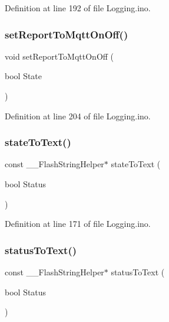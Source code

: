 Definition at line 192 of file Logging.\+ino.

\mbox{\label{_logging_8ino_a116482fed98acd57e3758b7e5a8a0d1c}} 
\subsubsection{\texorpdfstring{setReportToMqttOnOff()}{setReportToMqttOnOff()}}
{\footnotesize\ttfamily void set\+Report\+To\+Mqtt\+On\+Off (\begin{DoxyParamCaption}\item[{bool}]{State }\end{DoxyParamCaption})}



Definition at line 204 of file Logging.\+ino.

\mbox{\label{_logging_8ino_ade7f2afded867617cdacc2587cc31305}} 
\subsubsection{\texorpdfstring{stateToText()}{stateToText()}}
{\footnotesize\ttfamily const \+\_\+\+\_\+\+Flash\+String\+Helper$\ast$ state\+To\+Text (\begin{DoxyParamCaption}\item[{bool}]{Status }\end{DoxyParamCaption})}



Definition at line 171 of file Logging.\+ino.

\mbox{\label{_logging_8ino_a013895268de2e12a0aa1a8e88ff67b61}} 
\subsubsection{\texorpdfstring{statusToText()}{statusToText()}}
{\footnotesize\ttfamily const \+\_\+\+\_\+\+Flash\+String\+Helper$\ast$ status\+To\+Text (\begin{DoxyParamCaption}\item[{bool}]{Status }\end{DoxyParamCaption})}



